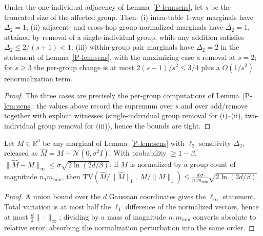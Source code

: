 \documentclass[sigconf, nonacm]{acmart}
\newcommand{\pref}[1]{\ref{P-#1}}
\begin{document}
\begin{lemma}
\label{lem:sens-tight}
Under the one-individual adjacency of Lemma~\pref{lem:sens}, let $s$ be the
truncated size of the affected group. Then:
(i) intra-table 1-way marginals have $\Delta_2=1$;
(ii) adjacent- and cross-hop group-normalized marginals have
$\Delta_2=1$, attained by removal of a single-individual group, while any
addition satisfies $\Delta_2\le2/(s+1)<1$;
(iii) within-group pair marginals have $\Delta_2=2$ in the statement of
Lemma~\pref{lem:sens}, with the maximizing case a removal at $s=2$; for
$s\ge3$ the per-group change is at most $2(s-1)/s^2\le3/4$ plus a
$O(1/s^2)$ renormalization term.
\end{lemma}
\begin{proof}
The three cases are precisely the per-group computations of
Lemma~\pref{lem:sens}; the values above record the supremum over $s$ and
over add/remove together with explicit witnesses (single-individual group
removal for (i)--(ii), two-individual group removal for (iii)), hence the
bounds are tight.
\end{proof}

\begin{corollary}
\label{cor:tv}
Let $M\in\mathbb{R}^d$ be any marginal of Lemma~\pref{lem:sens} with
$\ell_2$ sensitivity $\Delta_2$, released as
$\hat M=M+\mathcal{N}(0,\sigma^2 I)$. With probability $\ge1-\beta$,
$\|\hat M-M\|_\infty\le\sigma\sqrt{2\ln(2d/\beta)}$; if $M$ is normalized
by a group count of magnitude $n_1 m_{\min}$, then
$\mathrm{TV}(\hat M/\|\hat M\|_1,\;M/\|M\|_1)
\le \frac{d\,\sigma}{n_1 m_{\min}}\sqrt{2\ln(2d/\beta)}$.
\end{corollary}
\begin{proof}
A union bound over the $d$ Gaussian coordinates gives the
$\ell_\infty$ statement. Total variation is at most half the $\ell_1$
difference of the normalized vectors, hence at most
$\frac{d}{2}\|\cdot\|_\infty$; dividing by a mass of magnitude
$n_1m_{\min}$ converts absolute to relative error, absorbing the
normalization perturbation into the same order.
\end{proof}
\end{document}
